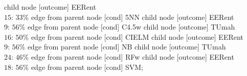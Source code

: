 child {node [outcome] {EERent \\$15$: $33\%$} edge from parent node [cond] {5NN}}
child {node [outcome] {EERent \\$9$: $56\%$} edge from parent node [cond] {C4.5w}}
child {node [outcome] {TUmah \\$16$: $50\%$} edge from parent node [cond] {CIELM}}
child {node [outcome] {EERent \\$9$: $56\%$} edge from parent node [cond] {NB}}
child {node [outcome] {TUmah \\$24$: $46\%$} edge from parent node [cond] {RFw}}
child {node [outcome] {EERent \\$18$: $56\%$} edge from parent node [cond] {SVM}};